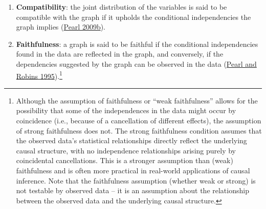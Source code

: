 \documentclass[
  singlecolumn]{article}
\begin{document}
\begin{enumerate}
\def\labelenumi{\arabic{enumi}.}
\setcounter{enumi}{7}
\item
  \textbf{Compatibility}: the joint distribution of the variables is
  said to be compatible with the graph if it upholds the conditional
  independencies the graph implies
  (\protect\hyperlink{ref-pearl2009a}{Pearl 2009b}).
\item
  \textbf{Faithfulness}: a graph is said to be faithful if the
  conditional independencies found in the data are reflected in the
  graph, and conversely, if the dependencies suggested by the graph can
  be observed in the data (\protect\hyperlink{ref-pearl1995a}{Pearl and
  Robins 1995}).\footnote{Although the assumption of faithfulness or
    ``weak faithfulness'' allows for the possibility that some of the
    independences in the data might occur by coincidence (i.e., because
    of a cancellation of different effects), the assumption of strong
    faithfulness does not. The strong faithfulness condition assumes
    that the observed data's statistical relationships directly reflect
    the underlying causal structure, with no independence relationships
    arising purely by coincidental cancellations. This is a stronger
    assumption than (weak) faithfulness and is often more practical in
    real-world applications of causal inference. Note that the
    faithfulness assumption (whether weak or strong) is not testable by
    observed data -- it is an assumption about the relationship between
    the observed data and the underlying causal structure.}
\end{enumerate}
\end{document}
